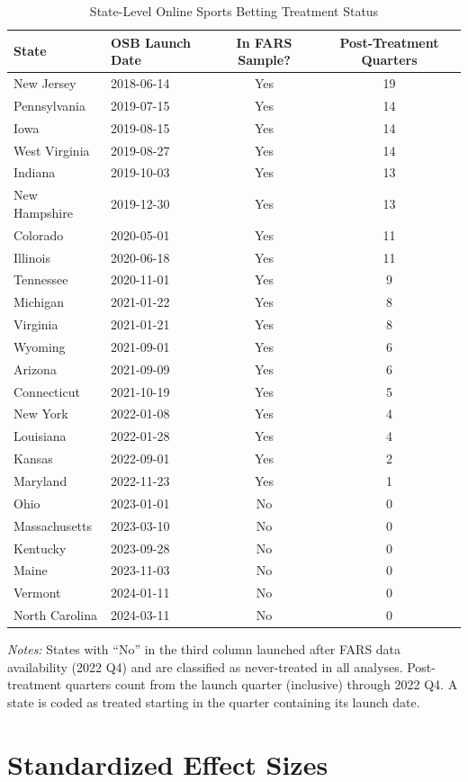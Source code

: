 \documentclass[12pt]{article}
\begin{document}
\begin{table}[h]
\centering
\caption{State-Level Online Sports Betting Treatment Status}
\label{tab:treatment_appendix}
\begin{tabular}{llcc}
\toprule
State & OSB Launch Date & In FARS Sample? & Post-Treatment Quarters \\
\midrule
New Jersey & 2018-06-14 & Yes & 19 \\
Pennsylvania & 2019-07-15 & Yes & 14 \\
Iowa & 2019-08-15 & Yes & 14 \\
West Virginia & 2019-08-27 & Yes & 14 \\
Indiana & 2019-10-03 & Yes & 13 \\
New Hampshire & 2019-12-30 & Yes & 13 \\
Colorado & 2020-05-01 & Yes & 11 \\
Illinois & 2020-06-18 & Yes & 11 \\
Tennessee & 2020-11-01 & Yes & 9 \\
Michigan & 2021-01-22 & Yes & 8 \\
Virginia & 2021-01-21 & Yes & 8 \\
Wyoming & 2021-09-01 & Yes & 6 \\
Arizona & 2021-09-09 & Yes & 6 \\
Connecticut & 2021-10-19 & Yes & 5 \\
New York & 2022-01-08 & Yes & 4 \\
Louisiana & 2022-01-28 & Yes & 4 \\
Kansas & 2022-09-01 & Yes & 2 \\
Maryland & 2022-11-23 & Yes & 1 \\
\midrule
Ohio & 2023-01-01 & No & 0 \\
Massachusetts & 2023-03-10 & No & 0 \\
Kentucky & 2023-09-28 & No & 0 \\
Maine & 2023-11-03 & No & 0 \\
Vermont & 2024-01-11 & No & 0 \\
North Carolina & 2024-03-11 & No & 0 \\
\bottomrule
\end{tabular}
\begin{tablenotes}
\small
\item \textit{Notes:} States with ``No'' in the third column launched after FARS data availability (2022 Q4) and are classified as never-treated in all analyses. Post-treatment quarters count from the launch quarter (inclusive) through 2022 Q4. A state is coded as treated starting in the quarter containing its launch date.
\end{tablenotes}
\end{table}

\section{Standardized Effect Sizes}
\label{sec:sde}


\end{document}
